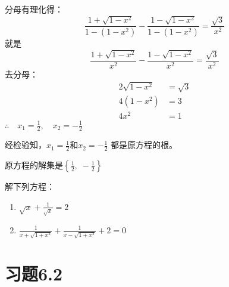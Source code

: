 \begin{solution}
    分母有理化得：
\[\frac{1+\sqrt{1-x^2}}{1-(1-x^2)}-\frac{1-\sqrt{1-x^2}}{1-(1-x^2)}=\frac{\sqrt{3}}{x^2}\]
就是
\[\frac{1+\sqrt{1-x^2}}{x^2}-\frac{1-\sqrt{1-x^2}}{x^2}=\frac{\sqrt{3}}{x^2}\]
去分母：
\[\begin{split}
    2\sqrt{1-x^2}&= \sqrt{3}\\
    4(1-x^2)&=3\\
    4x^2&=1
\end{split}\]
$\therefore\quad x_1=\frac{1}{2},\quad x_2=-\frac{1}{2}$

经检验知，$x_1=\frac{1}{2}$和$x_2=-\frac{1}{2}$
都是原方程的根。

原方程的解集是$\left\{\frac{1}{2},\; -\frac{1}{2}\right\}$
\end{solution}

\begin{ex}
    解下列方程：
\begin{enumerate}
    \item $\sqrt{x}+\frac{1}{\sqrt{x}}=2$
    \item $\frac{1}{x+\sqrt{1+x^2}}+\frac{1}{x-\sqrt{1+x^2}}+2=0$
\end{enumerate}
\end{ex}



\section*{习题6.2}

